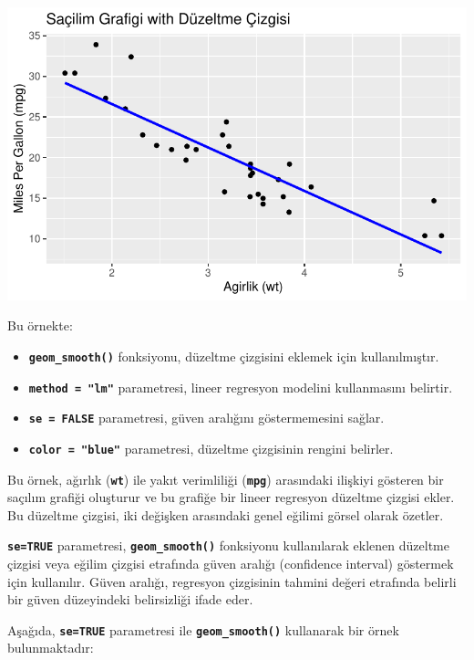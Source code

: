 \documentclass[
  letterpaper,
  DIV=11,
  numbers=noendperiod]{scrreprt}
\begin{document}
\includegraphics{ggplot2_files/figure-pdf/unnamed-chunk-12-1.pdf}

Bu örnekte:

\begin{itemize}
\item
  \textbf{\texttt{geom\_smooth()}} fonksiyonu, düzeltme çizgisini
  eklemek için kullanılmıştır.
\item
  \textbf{\texttt{method\ =\ "lm"}} parametresi, lineer regresyon
  modelini kullanmasını belirtir.
\item
  \textbf{\texttt{se\ =\ FALSE}} parametresi, güven aralığını
  göstermemesini sağlar.
\item
  \textbf{\texttt{color\ =\ "blue"}} parametresi, düzeltme çizgisinin
  rengini belirler.
\end{itemize}

Bu örnek, ağırlık (\textbf{\texttt{wt}}) ile yakıt verimliliği
(\textbf{\texttt{mpg}}) arasındaki ilişkiyi gösteren bir saçılım grafiği
oluşturur ve bu grafiğe bir lineer regresyon düzeltme çizgisi ekler. Bu
düzeltme çizgisi, iki değişken arasındaki genel eğilimi görsel olarak
özetler.

\textbf{\texttt{se=TRUE}} parametresi, \textbf{\texttt{geom\_smooth()}}
fonksiyonu kullanılarak eklenen düzeltme çizgisi veya eğilim çizgisi
etrafında güven aralığı (confidence interval) göstermek için kullanılır.
Güven aralığı, regresyon çizgisinin tahmini değeri etrafında belirli bir
güven düzeyindeki belirsizliği ifade eder.

Aşağıda, \textbf{\texttt{se=TRUE}} parametresi ile
\textbf{\texttt{geom\_smooth()}} kullanarak bir örnek bulunmaktadır:
\end{document}
